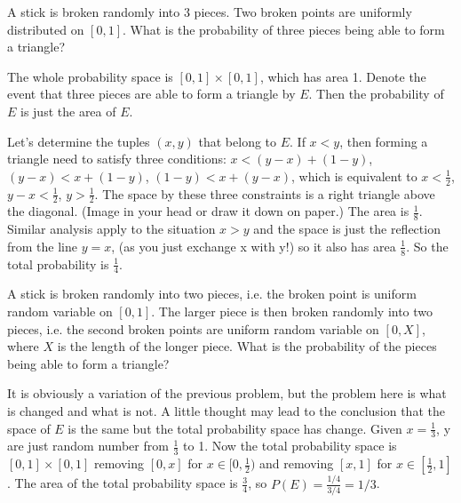 \begin{exe}
A stick is broken randomly into 3 pieces. Two broken points are uniformly distributed on $[0,1]$. What is the probability of three pieces being able to form a triangle?
\end{exe}
\begin{teacher}
\begin{sol}
The whole probability space is $[0,1]\times[0,1]$, which has area 1. Denote the event that three pieces are able to form a triangle by $E$. Then the probability of $E$ is just the area of $E$.

Let's determine the tuples $(x, y)$ that belong to $E$. If $x<y$, then forming a triangle need to satisfy three conditions: $x<(y-x)+(1-y)$, $(y-x)<x+(1-y)$, $(1-y)<x+(y-x)$, which is equivalent to $x<\frac{1}{2}$, $y-x<\frac{1}{2}$, $y>\frac{1}{2}$. The space by these three constraints is a right triangle above the diagonal. (Image in your head or draw it down on paper.) The area is $\frac{1}{8}$. Similar analysis apply to the situation $x>y$ and the space is just the reflection from the line $y=x$, (as you just exchange x with y!) so it also has area $\frac{1}{8}$. So the total probability is $\frac{1}{4}$.
\end{sol}
\end{teacher}

\begin{exe}
A stick is broken randomly into two pieces, i.e. the broken point is uniform random variable on $[0, 1]$. The larger piece is then broken randomly into two pieces, i.e. the second broken points are uniform random variable on $[0, X]$, where $X$ is the length of the longer piece. What is the probability of the pieces being able to form a triangle?
\end{exe}
\begin{teacher}
\begin{sol}
It is obviously a variation of the previous problem, but the problem here is what is changed and what is not. A little thought may lead to the conclusion that the space of $E$ is the same but the total probability space has change. Given $x=\frac{1}{3}$, y are just random number from $\frac{1}{3}$ to 1. Now the total probability space is $[0, 1]\times[0,1]$ removing $[0,x]$ for $x\in[0, \frac{1}{2})$ and removing $[x, 1]$ for $x\in [\frac{1}{2}, 1]$. The area of the total probability space is $\frac{3}{4}$, so $P(E) = \frac{1/4}{3/4} = 1/3$.
\end{sol}
\end{teacher}

